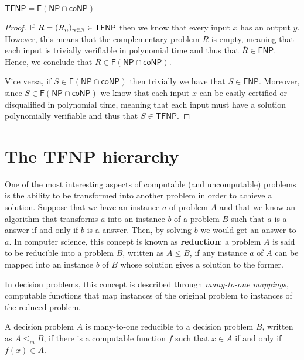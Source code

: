\begin{proposition}
    \label{tfnp_f_np_conp}
    $\mathsf{TFNP} = \mathsf{F}(\mathsf{NP} \cap \mathsf{coNP})$
\end{proposition}

\begin{proof}
 If $R = (R_n)_{n \in \mathbb{N}} \in \textsf{TFNP}$ then we know that every input $x$ has an output $y$. However, this means that the complementary problem $\overline{R}$ is empty, meaning that each input is trivially verifiable in polynomial time and thus that $\overline{R} \in \textsf{FNP}$. Hence, we conclude that $R \in \mathsf{F}(\mathsf{NP} \cap \mathsf{coNP})$.
    
 Vice versa, if $S \in \mathsf{F}(\mathsf{NP} \cap \mathsf{coNP})$ then trivially we have that $S \in \mathsf{FNP}$. Moreover, since $S \in \mathsf{F}(\mathsf{NP} \cap \mathsf{coNP})$ we know that each input $x$ can be easily certified or disqualified in polynomial time, meaning that each input must have a solution polynomially verifiable and thus that $S \in \mathsf{TFNP}$.

\end{proof}

\newpage

\section{The \textsf{TFNP} hierarchy}

One of the most interesting aspects of computable (and uncomputable) problems is the ability to be transformed into another problem in order to achieve a solution. Suppose that we have an instance $a$ of problem $A$ and that we know an algorithm that transforms $a$ into an instance $b$ of a problem $B$ such that $a$ is a  answer if and only if $b$ is a  answer. Then, by solving $b$ we would get an answer to $a$. In computer science, this concept is known as \textbf{reduction}: a problem $A$ is said to be reducible into a problem $B$, written as $A \leq B$, if any instance $a$ of $A$ can be mapped into an instance $b$ of $B$ whose solution gives a solution to the former.

In decision problems, this concept is described through \textit{many-to-one mappings}, computable functions that map instances of the original problem to instances of the reduced problem.

\begin{definition}
 A decision problem $A$ is many-to-one reducible to a decision problem $B$, written as $A \leq_m B$, if there is a computable function $f$ such that $x \in A$ if and only if $f(x) \in A$. 
\end{definition}

